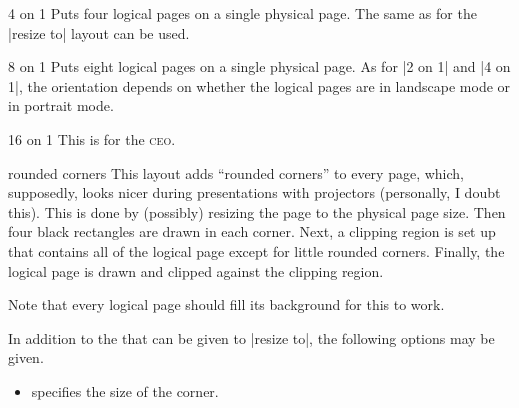 \begin{pgflayout}{4 on 1}
    Puts four logical pages on a single physical page. The same 
    as for the |resize to| layout can be used.
\end{pgflayout}

\begin{pgflayout}{8 on 1}
    Puts eight logical pages on a single physical page. As for |2 on 1| and |4
    on 1|, the orientation depends on whether the logical pages are in
    landscape mode or in portrait mode.
\end{pgflayout}

\begin{pgflayout}{16 on 1}
    This is for the \textsc{ceo}.
\end{pgflayout}

\begin{pgflayout}{rounded corners}
\label{layout-rounded-corners}
    This layout adds ``rounded corners'' to every page, which, supposedly,
    looks nicer during presentations with projectors (personally, I doubt
    this). This is done by (possibly) resizing the page to the physical page
    size. Then four black rectangles are drawn in each corner. Next, a clipping
    region is set up that contains all of the logical page except for little
    rounded corners. Finally, the logical page is drawn and clipped against the
    clipping region.

    Note that every logical page should fill its background for this to work.

    In addition to the  that can be given to |resize to|, the
    following options may be given.
    \begin{itemize}
        \item {} specifies the size of the
            corner.
    \end{itemize}
\end{pgflayout}

